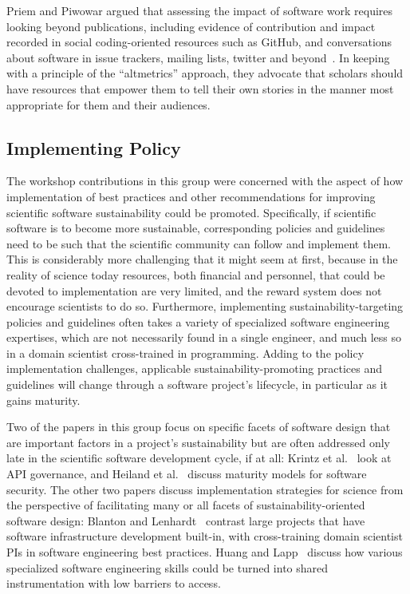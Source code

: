 \documentclass[11pt, oneside]{amsart}
\begin{document}
Priem and Piwowar argued that assessing the impact of software work
requires looking beyond publications, including evidence of
contribution and impact recorded in social coding-oriented resources
such as GitHub, and conversations about software in issue trackers,
mailing lists, twitter and beyond~\cite{Priem_WSSSPE}. In keeping with
a principle of the ``altmetrics'' approach, they advocate that
scholars should have resources that empower them to tell their own
stories in the manner most appropriate for them and their audiences.

\subsection{Implementing Policy}

The workshop contributions in this group were concerned with the
aspect of how implementation of best practices and other
recommendations for improving scientific software sustainability could
be promoted. Specifically, if scientific software is to become more
sustainable, corresponding policies and guidelines need to be such
that the scientific community can follow and implement them. This is
considerably more challenging that it might seem at first, because in
the reality of science today resources, both financial and personnel,
that could be devoted to implementation are very limited, and the
reward system does not encourage scientists to do so. Furthermore,
implementing sustainability-targeting policies and guidelines often
takes a variety of specialized software engineering expertises, which
are not necessarily found in a single engineer, and much less so in a
domain scientist cross-trained in programming. Adding to the policy
implementation challenges, applicable sustainability-promoting
practices and guidelines will change through a software project's
lifecycle, in particular as it gains maturity.

Two of the papers in this group focus on specific facets of software
design that are important factors in a project's sustainability but
are often addressed only late in the scientific software development
cycle, if at all: Krintz et al.~\cite{Krintz_WSSSPE} look at API
governance, and Heiland et al.~\cite{Heiland_WSSSPE} discuss maturity
models for software security. The other two papers discuss
implementation strategies for science from the perspective of
facilitating many or all facets of sustainability-oriented software
design: Blanton and Lenhardt~\cite{Blanton_WSSSPE} contrast large
projects that have software infrastructure development built-in, with
cross-training domain scientist PIs in software engineering best
practices. Huang and Lapp~\cite{Huang_WSSSPE} discuss how various
specialized software engineering skills could be turned into shared
instrumentation with low barriers to access.
\end{document}
